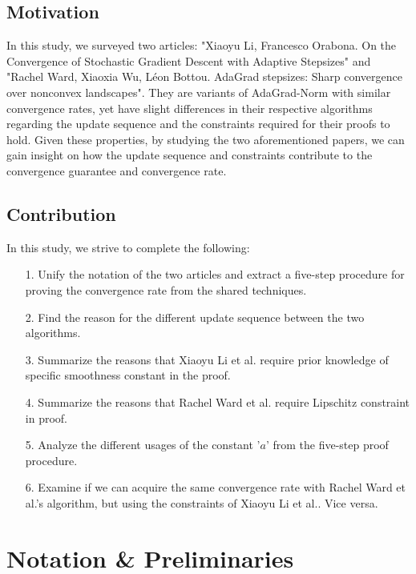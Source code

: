 \documentclass[14pt,onecolumn,letterpaper]{extarticle}
\begin{document}
\subsection{Motivation}
In this study, we surveyed two articles: "Xiaoyu Li, Francesco Orabona. On the Convergence of Stochastic Gradient Descent
with Adaptive Stepsizes" and "Rachel Ward, Xiaoxia Wu, Léon Bottou. AdaGrad stepsizes: Sharp convergence over nonconvex landscapes". They are variants of AdaGrad-Norm with similar convergence rates, yet have slight differences in their respective algorithms regarding the update sequence and the constraints required for their proofs to hold. Given these properties, by studying the two aforementioned papers, we can gain insight on how the update sequence and constraints contribute to the convergence guarantee and convergence rate.

\subsection{Contribution}
In this study, we strive to complete the following:
\begin{enumerate}
        \item [1.] Unify the notation of the two articles and extract a five-step procedure for proving the convergence rate from the shared techniques. 
        \item [2.] Find the reason for the different update sequence between the two algorithms.
        \item [3.] Summarize the reasons that Xiaoyu Li et al. require prior knowledge of specific smoothness constant in the proof.
        \item [4.] Summarize the reasons that Rachel Ward et al. require Lipschitz constraint in proof.
        \item [5.] Analyze the different usages of the constant '$a$' from the five-step proof procedure.
        \item [6.] Examine if we can acquire the same convergence rate with Rachel Ward et al.'s algorithm, but using the constraints of Xiaoyu Li et al.. Vice versa.
\end{enumerate}

\section{Notation \& Preliminaries}
\end{document}
